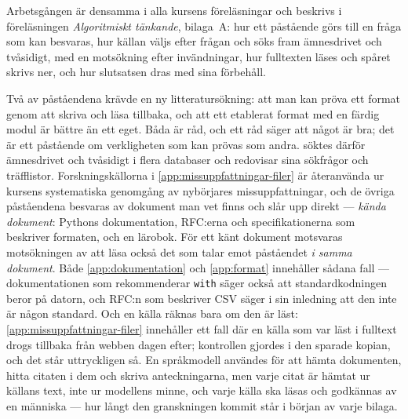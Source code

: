 Arbetsgången är densamma i alla kursens föreläsningar och beskrivs i
föreläsningen \emph{Algoritmiskt tänkande}, bilaga~A: hur ett påstående
görs till en fråga som kan besvaras, hur källan väljs efter frågan och
söks fram ämnesdrivet och tvåsidigt, med en motsökning efter
invändningar, hur fulltexten läses och spåret skrivs ner, och hur
slutsatsen dras med sina förbehåll.

Två av påståendena krävde en ny litteratursökning: att man kan pröva ett
format genom att skriva och läsa tillbaka, och att ett etablerat format
med en färdig modul är bättre än ett eget.  Båda är råd, och ett råd
säger att något är bra; det är ett påstående om verkligheten som kan
prövas som andra.   söktes därför
ämnesdrivet och tvåsidigt i flera databaser och redovisar sina
sökfrågor och träfflistor.  Forskningskällorna i
\cref{app:missuppfattningar-filer} är återanvända ur kursens
systematiska genomgång av nybörjares
missuppfattningar\autocite{SooriBosk2026}, och de övriga påståendena
besvaras av dokument man vet finns och slår upp direkt ---
\emph{kända dokument}: Pythons dokumentation, RFC:erna och
specifikationerna som beskriver formaten, och en lärobok.  För ett känt dokument motsvaras motsökningen
av att läsa också det som talar emot påståendet \emph{i samma
dokument}.  Både \cref{app:dokumentation} och \cref{app:format}
innehåller sådana fall --- dokumentationen som rekommenderar
\texttt{with} säger också att standardkodningen beror på
datorn, och RFC:n som beskriver CSV säger i sin inledning att den inte
är någon standard.  Och en källa räknas bara om den är läst:
\cref{app:missuppfattningar-filer} innehåller ett fall där en källa som
var läst i fulltext drogs tillbaka från webben dagen efter; kontrollen
gjordes i den sparade kopian, och det står uttryckligen så.  En
språkmodell användes för att hämta dokumenten, hitta citaten i dem och
skriva anteckningarna, men varje citat är hämtat ur källans text, inte
ur modellens minne, och varje källa ska läsas och godkännas av en
människa --- hur långt den granskningen kommit står i början av varje
bilaga.

